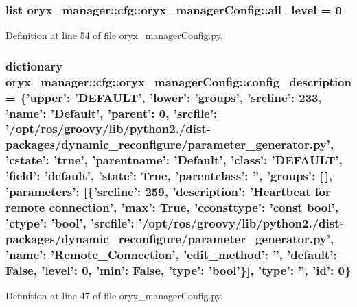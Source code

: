 \subsubsection[{all\-\_\-level}]{\setlength{\rightskip}{0pt plus 5cm}list {\bf oryx\-\_\-manager\-::cfg\-::oryx\-\_\-manager\-Config\-::all\-\_\-level} = 0}\label{namespaceoryx__manager_1_1cfg_1_1oryx__managerConfig_ad17b969649ad19586459281f38af0f94}


\-Definition at line 54 of file oryx\-\_\-manager\-Config.\-py.

\subsubsection[{config\-\_\-description}]{\setlength{\rightskip}{0pt plus 5cm}dictionary {\bf oryx\-\_\-manager\-::cfg\-::oryx\-\_\-manager\-Config\-::config\-\_\-description} = \{'upper'\-: '\-D\-E\-F\-A\-U\-L\-T', 'lower'\-: 'groups', 'srcline'\-: 233, 'name'\-: '\-Default', 'parent'\-: 0, 'srcfile'\-: '/opt/ros/groovy/lib/python2./dist-\/packages/dynamic\-\_\-reconfigure/parameter\-\_\-generator.\-py', 'cstate'\-: 'true', 'parentname'\-: '\-Default', 'class'\-: '\-D\-E\-F\-A\-U\-L\-T', 'field'\-: '{\bf default}', 'state'\-: \-True, 'parentclass'\-: '', 'groups'\-: [$\,$], 'parameters'\-: [\{'srcline'\-: 259, 'description'\-: '\-Heartbeat for remote connection', '{\bf max}'\-: \-True, 'cconsttype'\-: 'const bool', 'ctype'\-: 'bool', 'srcfile'\-: '/opt/ros/groovy/lib/python2./dist-\/packages/dynamic\-\_\-reconfigure/parameter\-\_\-generator.\-py', 'name'\-: '\-Remote\-\_\-\-Connection', 'edit\-\_\-method'\-: '', '{\bf default}'\-: \-False, '{\bf level}'\-: 0, '{\bf min}'\-: \-False, '{\bf type}'\-: 'bool'\}], '{\bf type}'\-: '', 'id'\-: 0\}}\label{namespaceoryx__manager_1_1cfg_1_1oryx__managerConfig_a97c802b9a566b7398643b4f138cfc2b4}


\-Definition at line 47 of file oryx\-\_\-manager\-Config.\-py.

